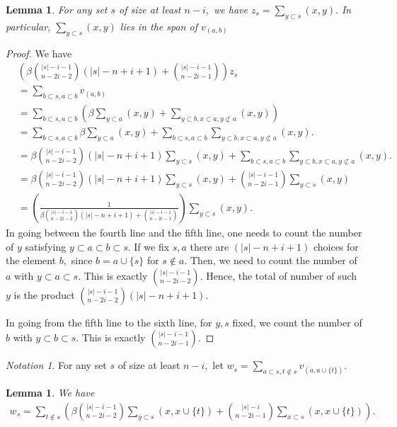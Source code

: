 \documentclass[10 pt]{amsart}
\theoremstyle{plain}
\newtheorem{lem}[thm]{Lemma}
\theoremstyle{definition}
\theoremstyle{remark}
\newtheorem{note}[thm]{Notation}
\numberwithin{equation}{section}
\begin{document}
\begin{lem}
\label{z_equivalence}
For any set $s$ of size at least $n-i,$ we have $z_s = \sum_{y \subset s}^{}(x, y).$ In particular, $\sum_{y \subset s}^{}(x, y)$ lies in the span of $v_{(a, b)}$
\end{lem}
\begin{proof}
We have 
\begin{align*}
	&\left(\beta\binom {|s|-i-1}{n-2i-2}(|s|-n+i+1)+\binom{|s|-i-1}{n-2i-1}\right) z_s \\
	&= \sum_{b\subset s,a \subset b}^{}v_{(a, b)}\\
	&=\sum_{b\subset s,a \subset b}^{} \left(\beta \sum_{y \subset a}^{}(x, y) + \sum_{y\subset b,x \subset a,y\not\subset a}^{}(x, y)\right)\\
	&= \sum_{b\subset s,a \subset b}^{} \beta \sum_{y \subset a}^{}(x, y) + \sum_{b\subset s,a \subset b}^{} \sum_{y\subset b,x \subset a,y\not\subset a}^{}(x, y).\\
	&= \beta\binom {|s|-i-1}{n-2i-2}(|s|-n+i+1) \sum_{y \subset s}^{}(x ,y)+ \sum_{b\subset s,a \subset b}^{} \sum_{y\subset b,x \subset a,y\not\subset a}^{}(x, y).\\
	&= \beta\binom {|s|-i-1}{n-2i-2}(|s|-n+i+1) \sum_{y \subset s}^{}(x ,y) + \binom{|s|-i-1}{n-2i-1}\sum_{y\subset s}^{}(x, y)\\
	& =\left(\frac{1}{\beta\binom {|s|-i-1}{n-2i-2}(|s|-n+i+1)+\binom{|s|-i-1}{n-2i-1}}\right) \sum_{y \subset s}^{}(x,y).
\end{align*}
In going between the fourth line and the fifth line, one needs to count the number of $y$ satisfying $y \subset a \subset b\subset s.$ If we fix $s,a$ there are $(|s|-n+i+1)$ choices for the element $b,$ since $b = a \cup \{s\}$ for $s \notin a.$ Then, we need to count the number of $a$ with $y \subset a \subset s.$ This is exactly $\binom {|s|-i-1}{n-2i-2}.$ Hence, the total of number of such $y$ is the product $\binom {|s|-i-1}{n-2i-2}(|s|-n+i+1).$

In going from the fifth line to the sixth line, for $y,s$ fixed, we count the number of $b$ with $y \subset b \subset s.$ This is exactly $\binom{|s|-i-1}{n-2i-1}$.
\end{proof}

\begin{note}
For any set $s$ of size at least $n-i,$ let $w_s = \sum_{a \subset s,t\notin s}^{}v_{(a, a \cup \{t\})}.$
\end{note}

\begin{lem}
\label{w_equivalence}
We have 
\begin{align*}
	w_s = \sum_{t\notin s}^{} \left(\beta \binom {|s|-i-1}{n-2i-2}	\sum_{y \subset s}^{}(x, x \cup \{t\})  + \binom {|s|-i}{n-2i-1} \sum_{x \subset s}^{}(x ,x \cup \{t\}) \right).
\end{align*}
\end{lem}
\end{document}
